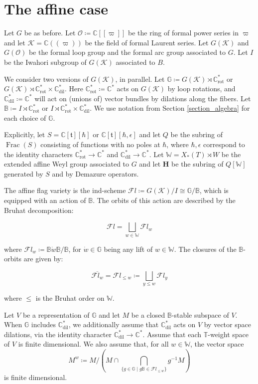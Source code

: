 \documentclass[11pt]{article}
\newcommand{\C}{\mathbb{C}}
\renewcommand{\O}{\mathcal{O}}
\newcommand{\K}{\mathcal{K}}
\renewcommand{\H}{\textbf{H}}
\renewcommand{\t}{\mathfrak{t}}
\newcommand{\bbG}{\mathbb{G}}
\newcommand{\bbB}{\mathbb{B}}
\newcommand{\1}{\mathbb{1}}
\newcommand{\tW}{\mathbb{W}}
\newcommand{\tT}{\mathbb{T}}
\newcommand{\Crot}{\C^*_{\text{rot}}}
\newcommand{\Cdil}{\C^*_{\text{dil}}}
\newcommand{\Fl}{\mathcal{F}l}
\theoremstyle{definition}
\numberwithin{equation}{section}
\begin{document}
\section{The affine case}
\label{section_affine}

Let $G$ be as before. Let $\O \coloneqq \C[[\varpi]]$ be the ring of formal power series in $\varpi$ and let $\K = \C((\varpi))$ be the field of formal Laurent series. Let $G(\K)$ and $G(\O)$ be the formal loop group and the formal arc group associated to $G$. Let $I$ be the Iwahori subgroup of $G(\K)$ associated to $B$.

We consider two versions of $G(\K)$, in parallel. Let $\bbG\coloneqq G(\K) \rtimes \Crot$ or $G(\K)\rtimes \Crot \times \Cdil$. Here $\Crot \coloneqq \C^*$ acts on $G(\K)$ by loop rotations, and $\Cdil \coloneqq \C^*$ will act on (unions of) vector bundles by dilations along the fibers. Let $\bbB \coloneqq I \rtimes \Crot$ or $I \rtimes \Crot \times \Cdil$. We use notation from Section \ref{section_algebra} for each choice of $\bbG$. 

Explicitly, let $S = \C[\t][\hbar]$ or $\C[\t][\hbar, \epsilon]$ and let $Q$ be the subring of $\operatorname{Frac}(S)$ consisting of functions with no poles at $\hbar$, where $\hbar, \epsilon$ correspond to the identity characters $\Crot \rightarrow \C^*$ and $\Cdil \rightarrow \C^*$. Let $\tW = X_*(T) \rtimes W$ be the extended affine Weyl group associated to $G$ and let $\H$ be the subring of $Q[\tW]$ generated by $S$ and by Demazure operators.

The affine flag variety is the ind-scheme $\Fl \coloneqq G(\K) / I \cong \bbG/\bbB$, which is equipped with an action of $\bbB$. The orbits of this action are described by the Bruhat decomposition:

$$\Fl = \bigsqcup_{w\in \tW} \Fl_w$$

\noindent where $\Fl_w\coloneqq \bbB \dot{w} \bbB/\bbB$, for $\dot{w} \in \bbG$ being any lift of $w\in \tW$. The closures of the $\bbB$-orbits are given by:

$$\overline{\Fl_w} = \Fl_{\leq w} \coloneqq \bigsqcup_{y\leq w} \Fl_y$$

\noindent where $\leq$ is the Bruhat order on $\tW$.

Let $V$ be a representation of $\mathbb{G}$ and let $M$ be a closed $\bbB$-stable subspace of $V$. When $\bbG$ includes $\Cdil$, we additionally assume that $\Cdil$ acts on $V$ by vector space dilations, via the identity character $\Cdil \rightarrow \C^*$. Assume that each $\tT$-weight space of $V$ is finite dimensional. We also assume that, for all $w \in \tW$, the vector space 
$$M^w \coloneqq M / (M \cap \bigcap_{\{g\in \bbG \mid g\bbB \in \Fl_{\leq w}\}} g^{-1}M)$$ is finite dimensional.
\end{document}
